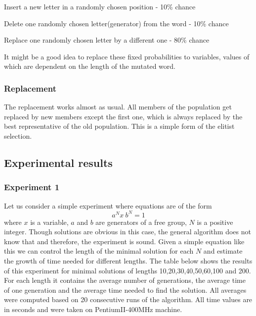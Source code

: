 \documentclass{article}
\begin{document}
Insert a new letter in a randomly chosen position - 10\% chance
 
Delete one randomly chosen letter(generator) from the word -  10\% chance

Replace one randomly chosen letter by a different one -  80\% chance

\noindent
It might be a good idea to replace these fixed probabilities to
variables, values of which are dependent on the length of the mutated
word.

    \subsubsection{Replacement}

The replacement works almost as usual. All members of the population
get replaced by new members except the first one, which is always
replaced by the best representative of the old population. This is a
simple form of the elitist selection.

  \subsection{Experimental results}

  \subsubsection{Experiment 1}

Let us consider a simple experiment where equations are of the form
\[
a^N x \: b^N = 1
\]
where $x$ is a variable, $a$ and $b$ are generators of a free group,
$N$ is a positive integer. Though solutions are obvious in this case,
the general algorithm does not know that and therefore, the experiment
is sound. Given a simple equation like this we can control the length
of the minimal solution for each $N$ and estimate the growth of time
needed for different lengths. The table below shows the results of
this experiment for minimal solutions of lengths 10,20,30,40,50,60,100
and 200. For each length it contains the average number of
generations, the average time of one generation and the average time
needed to find the solution. All averages were computed based on 20
consecutive runs of the algorithm. All time values are in seconds and
were taken on PentiumII-400MHz machine. 
\end{document}
